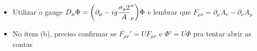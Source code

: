 \begin{itemize}
    \item Utilizar o gauge $D_{\mu}\Phi = \qty(\partial_{\mu} - ig\dfrac{\sigma_{a}{2}}A_{\mu}^{a})\Phi$ e lembrar que $F_{\mu\nu} = \partial_{\mu}A_{\nu} - \partial_{\nu}A_{\mu}$
    \item No item (b), preciso confirmar se $F_{\mu\nu}' = UF_{\mu\nu}$ e $\Phi' = U\Phi$ pra tentar abrir as contas
\end{itemize}